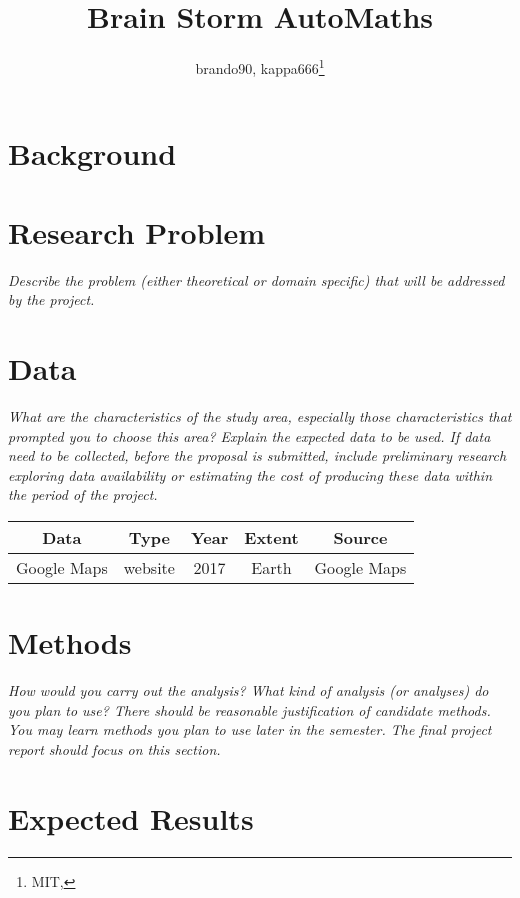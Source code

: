 \documentclass[11pt]{article}
\title{Brain Storm AutoMaths}
\author{brando90, kappa666\footnote{ MIT, \email{brando90, kappa666}}}
\makeatletter
\let\inserttitle\@title
\let\insertauthor\@author
\makeatother
\begin{document}
\begin{center}
  \LARGE{\inserttitle}

  \Large{\insertauthor}
\end{center}

\section{Background}

\section{Research Problem}

\textit{Describe the problem (either theoretical or domain specific) that will be addressed by the project.}

\section{Data}

\textit{What are the characteristics of the study area, especially those characteristics that prompted you to choose this area?
Explain the expected data to be used. If data need to be collected, before the proposal is submitted, include preliminary research exploring data availability or estimating the cost of producing these data within the period of the project.}

\begin{center}
  \begin{tabular}{ |c|c|c|c|c| }
  \hline
  \textbf{Data}  &  \textbf{Type}  &  \textbf{Year}  &  \textbf{Extent}  &  \textbf{Source}  \\
  \hline
  Google Maps   &  website  &  2017  &  Earth  &  Google Maps \cite{google_maps}  \\
  \hline
  \end{tabular}
\end{center}

\section{Methods}

\textit{How would you carry out the analysis? What kind of analysis (or analyses) do you plan to use? There should be reasonable justification of candidate methods. You may learn methods you plan to use later in the semester. The final project report should focus on this section.}

\section{Expected Results}
\end{document}
